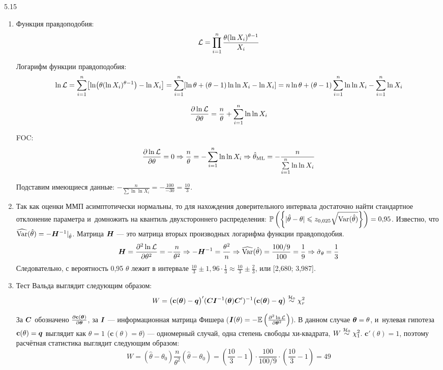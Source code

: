 \protect \hypertarget {soln:5.15}{}
\begin{solution}{{5.15}}
  \begin{enumerate}

\item Функция правдоподобия: \[\mathcal{L} = \prod_{i=1}^{n} \frac{\theta (\ln X_i)^{\theta-1}}{X_i}\]

Логарифм функции правдоподобия: \[\ln \calL = \sum\limits_{i=1}^{n} \bigl[\ln \bigl(\theta (\ln X_i)^{\theta-1} \bigr) - \ln X_i \bigr] = \sum\limits_{i=1}^{n} [\ln \theta + (\theta-1) \ln\ln X_i - \ln X_i] \hm= n \ln \theta + (\theta-1) \sum\limits_{i=1}^{n} \ln \ln X_i - \sum\limits_{i=1}^{n} \ln X_i\]

\[\frac{\partial \ln \mathcal{L}}{\partial \theta} = \frac{n}{\theta} + \sum\limits_{i=1}^{n} \ln \ln X_i \]

FOC: \[\frac{\partial \ln \mathcal{L}}{\partial \theta} = 0 \Rightarrow \frac{n}{\theta} = -\sum\limits_{i=1}^{n} \ln \ln X_i \Rightarrow \hat\theta_{\text{ML}} = - \frac{n}{\sum\limits_{i=1}^{n} \ln \ln X_i} \]

Подставим имеющиеся данные: $- \frac{n}{\sum \ln \ln X_i} = -\frac{100}{-30} = \frac{10}{3}$.



\item Так как оценки ММП асимптотически нормальны, то для нахождения доверительного интервала достаточно найти стандартное отклонение параметра  и~домножить на квантиль двухстороннего распределения: $\mathbb{P}\left(\left\{|\hat\theta-\theta| \leqslant z_{0{,}025} \sqrt{\operatorname{Var}(\hat\theta)}\right\}\right) = 0{,}95$. Известно, что $\widehat{\operatorname{Var}}(\hat \theta) = -\boldsymbol{H}^{-1} |_{\hat\theta}$. Матрица $\boldsymbol{H}$ — это матрица вторых производных логарифма функции правдоподобия.
\[
\boldsymbol{H} = \frac{\partial^2 \ln \mathcal{L}}{\partial \theta^2} = -\frac{n}{\theta^2} \Rightarrow -\boldsymbol{H}^{-1} = \frac{\theta^2}{n} \Rightarrow \widehat{\operatorname{Var}}(\hat\theta) = \frac{100/9}{100} = \frac19 \Rightarrow \hat\sigma_{\theta} = \frac13
\]
Следовательно, с вероятность 0,95 $\theta$ лежит в интервале $\frac{10}{3} \pm 1{,}96 \cdot \frac{1}{3} \approx \frac{10}{3} \pm \frac{2}{3}$, или [2{,}680; 3{,}987].



\item Тест Вальда  выглядит следующим образом:
\[
W = \bigl(\mathbf{c}(\boldsymbol{\theta}) - \boldsymbol{q}\bigr)' (\boldsymbol{C} \boldsymbol{I}^{-1}(\boldsymbol{\theta}) \boldsymbol{C}')^{-1} \bigl(\mathbf{c}(\boldsymbol{\theta}) - \boldsymbol{q} \bigr) \mathrel{\stackrel{\mathcal{H}_0}{\sim}} \chi^2_{r}
\]

За $\boldsymbol{C}$ обозначено $\frac{\partial \mathbf{c}(\boldsymbol{\theta})}{\partial \boldsymbol{\theta}}$, за $\boldsymbol{I}$ — информационная матрица Фишера ($\boldsymbol{I}(\theta) = -\mathbb{E}\left( \frac{\partial^2 \ln \mathcal{L}}{\partial \boldsymbol{\theta}^2} \right)$). В данном случае $\boldsymbol{\theta} = \theta$, и~нулевая гипотеза $\mathbf{c}(\theta) = \boldsymbol{q}$ выглядит как $\theta=1$ ($\mathbf{c}(\theta) = \theta$) — одномерный случай, одна степень свободы хи-квадрата, $W \mathrel{\stackrel{\mathcal{H}_0}{\sim}} \chi^2_1$. $\mathbf{c}'(\theta) = 1$, поэтому расчётная статистика выглядит следующим образом:
\[
W = (\hat\theta - \theta_0) \frac{n}{\theta^2} (\hat\theta - \theta_0) = \left( \frac{10}{3} - 1 \right) \cdot \frac{100}{100/9} \cdot \left( \frac{10}{3} - 1 \right) = 49
\]


\end{enumerate}
\end{solution}
